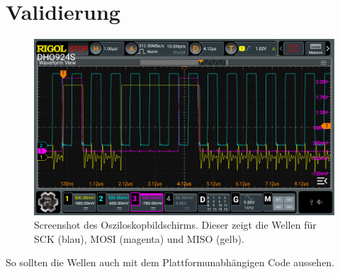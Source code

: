 \section{Validierung}


\begin{figure}[H]
	\includegraphics[width=\textwidth]{Pics/oszi_cube_spi_example.png}
	\caption{Screenshot des Osziloskopbildschirms. Dieser zeigt die Wellen für SCK (blau), MOSI (magenta) und MISO (gelb).}
	\label{fig:oszi_cube_spi_example}
\end{figure}

So sollten die Wellen auch mit dem Plattformunabhängigen Code aussehen.